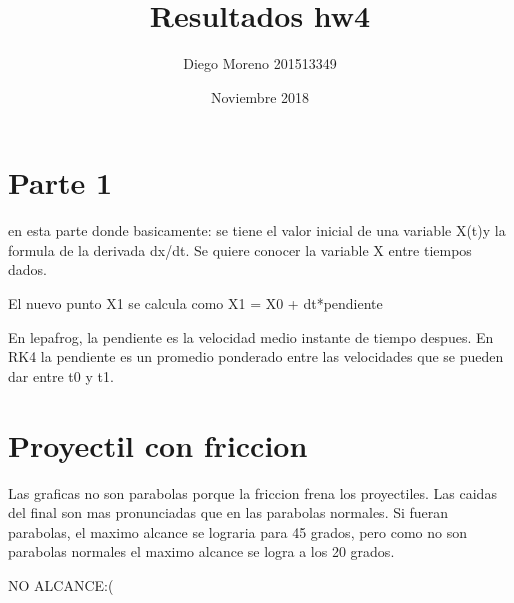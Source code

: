 \documentclass{article}
\title{Resultados hw4}
\author{Diego Moreno 201513349 }
\date{Noviembre 2018}
\begin{document}
\maketitle

\section{Parte 1  }
en esta parte donde basicamente: se tiene el valor inicial de una variable X(t)y la formula de la derivada dx/dt. Se quiere conocer la variable X entre tiempos dados.

El nuevo punto X1 se calcula como
X1 = X0 + dt*pendiente

En lepafrog, la pendiente es la velocidad medio instante de tiempo despues. En RK4 la pendiente es un promedio ponderado entre las velocidades que se pueden dar entre t0 y t1.

\section{ Proyectil con friccion}
Las graficas no son parabolas porque la friccion frena los proyectiles. Las caidas del final son mas pronunciadas que en las parabolas normales. Si fueran parabolas, el maximo alcance se lograria para 45 grados, pero como no son parabolas normales el maximo alcance se logra a los 20 grados.

NO ALCANCE:(
\end{document}
